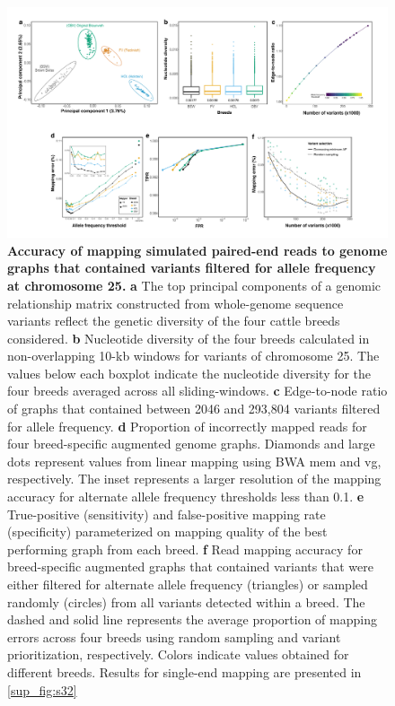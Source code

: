 \documentclass[../main.tex]{subfiles}
\begin{document}
\begin{figure}[!htb]
    \centering
    \includegraphics[width=\textwidth]{paper2/main_figure/Fig2.pdf}
    \caption[Affect allele frequency on graph mapping accuracy]{\textbf{Accuracy of mapping simulated paired-end reads to genome graphs that contained variants filtered for allele frequency at chromosome 25.} 
    \small{\textbf{a} The top principal components of a genomic relationship matrix constructed from whole-genome sequence variants reflect the genetic diversity of the four cattle breeds considered. \textbf{b} Nucleotide diversity of the four breeds calculated in non-overlapping 10-kb windows for variants of chromosome 25. The values below each boxplot indicate the nucleotide diversity for the four breeds averaged across all sliding-windows. \textbf{c} Edge-to-node ratio of graphs that contained between 2046 and 293,804 variants filtered for allele frequency. \textbf{d} Proportion of incorrectly mapped reads for four breed-specific augmented genome graphs. Diamonds and large dots represent values from linear mapping using BWA mem and vg, respectively. The inset represents a larger resolution of the mapping accuracy for alternate allele frequency thresholds less than 0.1. \textbf{e} True-positive (sensitivity) and false-positive mapping rate (specificity) parameterized on mapping quality of the best performing graph from each breed. \textbf{f} Read mapping accuracy for breed-specific augmented graphs that contained variants that were either filtered for alternate allele frequency (triangles) or sampled randomly (circles) from all variants detected within a breed. The dashed and solid line represents the average proportion of mapping errors across four breeds using random sampling and variant prioritization, respectively. Colors indicate values obtained for different breeds. Results for single-end mapping are presented in \ref{sup_fig:s32}}}
    \label{fig32:freq}
\end{figure}
\end{document}
